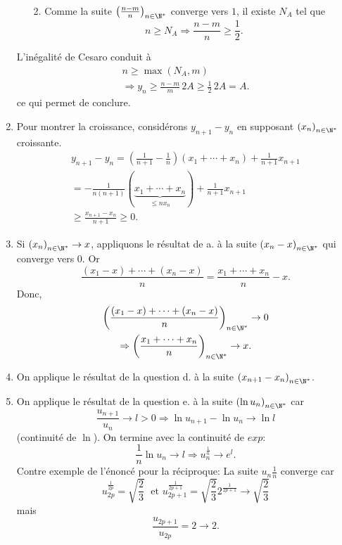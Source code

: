 \begin{enumerate}
\begin{itemize}
 \item [2.] Comme la suite $\left( \frac{n-m}{n} \right)_{n \in \N^*}$ converge vers $1$, il existe $N_A$ tel que 
\[
 n \geq N_A 
 \Rightarrow \frac{n - m}{n} \geq \frac{1}{2}.
\]
\end{itemize}
L'inégalité de Cesaro conduit à
\begin{multline*}
 n \geq \max(N_{A},m) \\
 \Rightarrow y_n \geq  \frac{n-m}{m}\,2A \geq \frac{1}{2}\, 2A =A.
\end{multline*}
ce qui permet de conclure.

 \item Pour montrer la croissance, considérons $y_{n+1} - y_n$ en supposant $\left( x_n \right)_{n \in \N^*}$ croissante.
\begin{multline*}
 y_{n+1} - y_n 
 = (\frac{1}{n+1} - \frac{1}{n})(x_1 + \cdots +x_n) + \frac{1}{n+1}x_{n+1} \\
 = -\frac{1}{n(n+1)}(\underset{\leq n x_n}{\underbrace{x_1 + \cdots +x_n}}) + \frac{1}{n+1}x_{n+1}\\
 \geq \frac{x_{n+1} - x_n}{n+1} \geq 0.
\end{multline*}

 \item Si $\left( x_n \right)_{n \in \N^*} \rightarrow x$, appliquons le résultat de a. à la suite $\left( x_n -x \right)_{n \in \N^*}$ qui converge vers 0. Or
\[
 \frac{(x_1-x) + \cdots + (x_n-x)}{n} = \frac{x_1 +\cdots + x_n}{n}- x.
\]
Donc,
\begin{multline*}
 \left( \frac{(x_1-x) + \cdots + (x_n-x)}{n} \right)_{n \in \N^*} \rightarrow 0 \\
 \Rightarrow \left( \frac{x_1 + \cdots + x_n}{n} \right)_{n \in \N^*} \rightarrow x.
\end{multline*}

 \item On applique le résultat de la question d. à la suite $\left( x_{n+1} - x_n \right)_{n \in \N^*}$. 
 \item On applique le résultat de la question e. à la suite $\left( \ln u_n \right)_{n \in \N^*}$ car
\[
 \frac{u_{n+1}}{u_n} \rightarrow l> 0 \Rightarrow \ln u_{n+1} - \ln u_n \rightarrow \ln l
\]
(continuité de $\ln$). On termine avec la continuité de $exp$:
\[
 \frac{1}{n}\ln u_n \rightarrow l \Rightarrow u_n^{\frac{1}{n}} \rightarrow e^{l}.
\]
Contre exemple de l'énoncé pour la réciproque:\newline
La suite $u_n\frac{1}{n}$ converge car 
\[
 u_{2p}^{\frac{1}{2p}} = \sqrt{\frac{2}{3}} \; 
\text{ 
et }
 u_{2p+1}^{\frac{1}{2p+1}} = \sqrt{\frac{2}{3}} 2^{\frac{1}{2p+1}} \rightarrow \sqrt{\frac{2}{3}} 
\]
mais
\[
 \frac{u_{2p+1}}{u_{2p}} = 2 \rightarrow 2.
\]


\end{enumerate}
